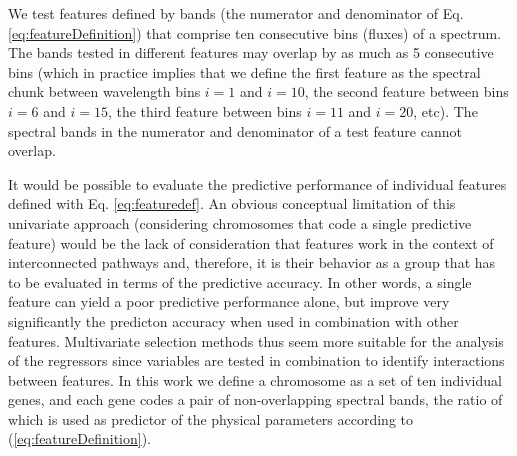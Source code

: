 We test features defined by bands (the numerator and denominator of
Eq. \ref{eq:featureDefinition}) that comprise ten consecutive bins
(fluxes) of a spectrum. The bands tested in different features may
overlap by as much as 5 consecutive bins (which in practice implies
that we define the first feature as the spectral chunk between
wavelength bins $i=1$ and $i=10$, the second feature between bins
$i=6$ and $i=15$, the third feature between bins $i=11$ and $i=20$,
etc). The spectral bands in the numerator and denominator of a test
feature cannot overlap.

It would be possible to evaluate the predictive performance of
individual features defined with Eq. \ref{eq:featuredef}. An obvious
conceptual limitation of this univariate approach (considering
chromosomes that code a single predictive feature) would be the lack
of consideration that features work in the context of interconnected
pathways and, therefore, it is their behavior as a group that has to
be evaluated in terms of the predictive accuracy. In other words, a
single feature can yield a poor predictive performance alone, but
improve very significantly the predicton accuracy when used in
combination with other features. Multivariate selection methods thus
seem more suitable for the analysis of the regressors since variables
are tested in combination to identify interactions between
features. In this work we define a chromosome as a set of ten
individual genes, and each gene codes a pair of non-overlapping
spectral bands, the ratio of which is used as predictor of the
physical parameters according to (\ref{eq:featureDefinition}).

